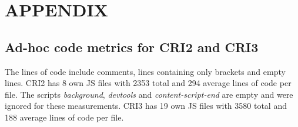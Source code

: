 \chapter{APPENDIX}
\label{ch:Appendix}
\section{Ad-hoc code metrics for CRI2 and CRI3}
The lines of code include comments, lines containing only brackets and empty lines.
CRI2 has 8 own JS files with 2353 total and 294 average lines of code per file. The scripts \emph{background}, \emph{devtools} and \emph{content-script-end} are empty and were ignored for these measurements.
CRI3 has 19 own JS files with 3580 total and 188 average lines of code per file.